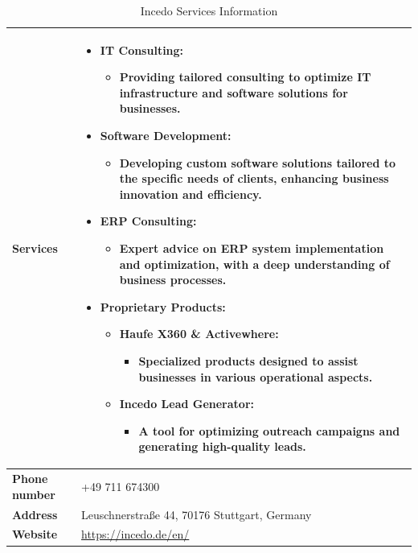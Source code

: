   \begin{table}[H]
    \centering
    \begin{tabular}{|p{4cm}|p{9cm}|}
      \hline
      \textbf{Services} & 
      \begin{itemize}
        \item \textbf{IT Consulting:}
        \begin{itemize}
          \item Providing tailored consulting to optimize IT infrastructure and software solutions for businesses.
        \end{itemize}
        \item \textbf{Software Development:}
        \begin{itemize}
          \item Developing custom software solutions tailored to the specific needs of clients, enhancing business innovation and efficiency.
        \end{itemize}
        \item \textbf{ERP Consulting:}
        \begin{itemize}
          \item Expert advice on ERP system implementation and optimization, with a deep understanding of business processes.
        \end{itemize}
        \item \textbf{Proprietary Products:}
        \begin{itemize}
          \item \textbf{Haufe X360 \& Activewhere:}
          \begin{itemize}
            \item Specialized products designed to assist businesses in various operational aspects.
          \end{itemize}
          \item \textbf{Incedo Lead Generator:}
          \begin{itemize}
            \item A tool for optimizing outreach campaigns and generating high-quality leads.
          \end{itemize}
        \end{itemize}
      \end{itemize}
      \\
      \hline
      \textbf{Phone number} & +49 711 674300 \\
      \hline
      \textbf{Address} & Leuschnerstraße 44, 70176 Stuttgart, Germany \\
      \hline
      \textbf{Website} & \url{https://incedo.de/en/} \\
      \hline
    \end{tabular}
    \caption{Incedo Services Information}
    \label{tab:incedo-services}
  \end{table}
  
